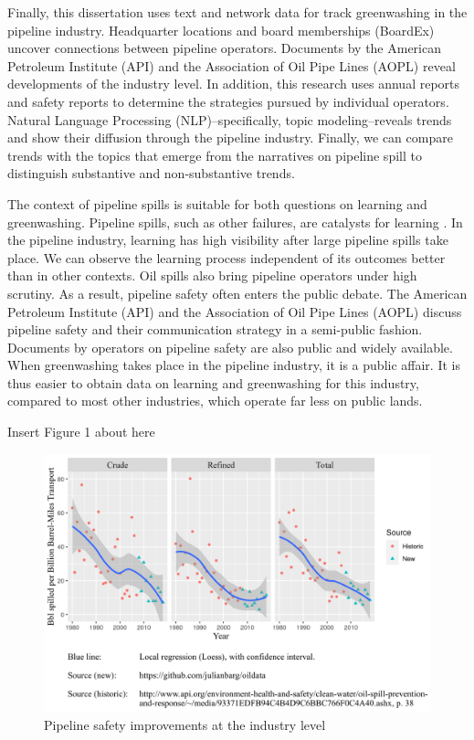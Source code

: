 Finally, this dissertation uses text and network data for track greenwashing in the pipeline industry. Headquarter locations and board memberships (BoardEx) uncover connections between pipeline operators. Documents by the American Petroleum Institute (API) and the Association of Oil Pipe Lines (AOPL) reveal developments of the industry level. In addition, this research uses annual reports and safety reports to determine the strategies pursued by individual operators. Natural Language Processing (NLP)--specifically, topic modeling--reveals trends and show their diffusion through the pipeline industry. Finally, we can compare trends with the topics that emerge from the narratives on pipeline spill to distinguish substantive and non-substantive trends.

The context of pipeline spills is suitable for both questions on learning and greenwashing. Pipeline spills, such as other failures, are catalysts for learning \citep{March1991}. In the pipeline industry, learning has high visibility after large pipeline spills take place. We can observe the learning process independent of its outcomes better than in other contexts. Oil spills also bring pipeline operators under high scrutiny. As a result, pipeline safety often enters the public debate. The American Petroleum Institute (API) and the Association of Oil Pipe Lines (AOPL) discuss pipeline safety and their communication strategy in a semi-public fashion. Documents by operators on pipeline safety are also public and widely available. When greenwashing takes place in the pipeline industry, it is a public affair. It is thus easier to obtain data on learning and greenwashing for this industry, compared to most other industries, which operate far less on public lands.

{\noindent}\dotfill

	\centerline{Insert Figure 1 about here}

{\noindent}\dotfill

\begin{figure}
	\caption{Pipeline safety improvements at the industry level}
	\centerline{\includegraphics{../illustrations/population_learning_4.png}}
\end{figure}

